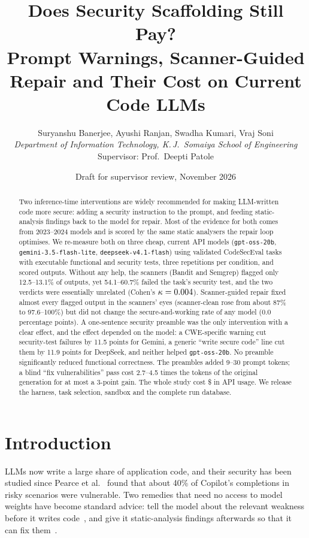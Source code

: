 \documentclass[10pt]{article}
\title{Does Security Scaffolding Still Pay?\\
Prompt Warnings, Scanner-Guided Repair and Their Cost on Current Code LLMs}
\author{
  Suryanshu Banerjee, Ayushi Ranjan, Swadha Kumari, Vraj Soni\\
  \textit{Department of Information Technology, K.\,J.\ Somaiya School of Engineering}\\
  \small Supervisor: Prof.\ Deepti Patole
}
\date{Draft for supervisor review, November 2026}
\begin{document}
\maketitle

\begin{abstract}
Two inference-time interventions are widely recommended for making LLM-written code more secure: adding a
security instruction to the prompt, and feeding static-analysis findings back to the model for repair. Most of the
evidence for both comes from 2023--2024 models and is scored by the same static analysers the repair loop
optimises. We re-measure both on three cheap, current API models (\texttt{gpt-oss-20b},
\texttt{gemini-3.5-flash-lite}, \texttt{deepseek-v4.1-flash}) using \NTasks{} validated CodeSecEval tasks with
executable functional and security tests, three repetitions per condition, and \NCells{} scored outputs. Without any
help, the scanners (Bandit and Semgrep) flagged only 12.5--13.1\% of outputs, yet 54.1--60.7\% failed the task's
security test, and the two verdicts were essentially unrelated (Cohen's $\kappa=0.004$). Scanner-guided repair
fixed almost every flagged output in the scanners' eyes (scanner-clean rose from about 87\% to 97.6--100\%) but did
not change the secure-and-working rate of any model (0.0 percentage points). A one-sentence security preamble was
the only intervention with a clear effect, and the effect depended on the model: a CWE-specific warning cut
security-test failures by 11.5 points for Gemini, a generic ``write secure code'' line cut them by 11.9 points for
DeepSeek, and neither helped \texttt{gpt-oss-20b}. No preamble significantly reduced functional correctness. The
preambles added 9--30 prompt tokens; a blind ``fix vulnerabilities'' pass cost 2.7--4.5 times the tokens of the
original generation for at most a 3-point gain. The whole study cost \$\TotalCost{} in API usage. We release the
harness, task selection, sandbox and the complete run database.
\end{abstract}

\section{Introduction}
LLMs now write a large share of application code, and their security has been studied since Pearce et
al.~\cite{pearce2022asleep} found that about 40\% of Copilot's completions in risky scenarios were vulnerable. Two
remedies that need no access to model weights have become standard advice: tell the model about the relevant
weakness before it writes code~\cite{wang2023secucogen,tony2024prompting}, and give it static-analysis findings
afterwards so that it can fix them~\cite{alrashedy2023fdsp,hajipour2024hexacoder}.
\end{document}
